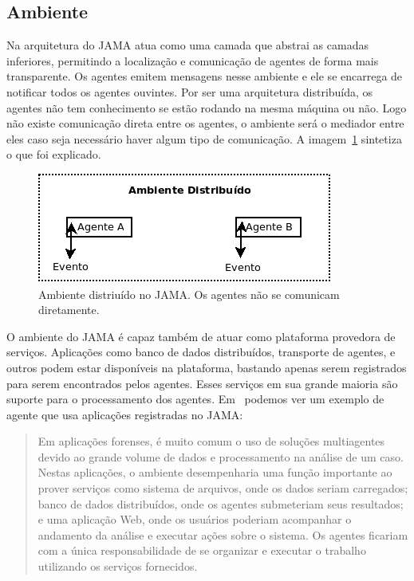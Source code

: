 \subsection{Ambiente}

Na arquitetura do JAMA atua como uma camada que abstrai as camadas inferiores, permitindo a localização e comunicação de agentes de forma mais transparente. Os agentes emitem mensagens nesse ambiente e ele se encarrega de notificar todos os agentes ouvintes. Por ser uma arquitetura distribuída, os agentes não tem conhecimento se estão rodando na mesma máquina ou não. Logo não existe comunicação direta entre os agentes, o ambiente será o mediador entre eles caso seja necessário haver algum tipo de comunicação. A imagem~\ref{fig:ambiente} sintetiza o que foi explicado.

\begin{figure}
	\centering
	\includegraphics[scale=0.75]{images/ambiente.png}
	\caption{Ambiente distriuído no JAMA. Os agentes não se comunicam diretamente.}
	\label{fig:ambiente}
\end{figure}

O ambiente do JAMA é capaz também de atuar como plataforma provedora de serviços. Aplicações como banco de dados distribuídos, transporte de agentes, e outros podem estar disponíveis na plataforma, bastando apenas serem registrados para serem encontrados pelos agentes. Esses serviços em sua grande maioria são suporte para o processamento dos agentes. Em~\cite{parise11} podemos ver um exemplo de agente que usa aplicações registradas no JAMA:

\begin{quote}
Em aplicações forenses, é muito comum o uso de soluções multiagentes devido ao grande volume de dados e processamento na análise de um caso. Nestas aplicações, o ambiente desempenharia uma função importante ao prover serviços como sistema de arquivos, onde os dados seriam carregados; banco de dados distribuídos, onde os agentes submeteriam seus resultados; e uma aplicação Web, onde os usuários poderiam acompanhar o andamento da análise e executar ações sobre o sistema. Os agentes ficariam com a única responsabilidade de se organizar e executar o trabalho utilizando os serviços fornecidos.
\end{quote}

